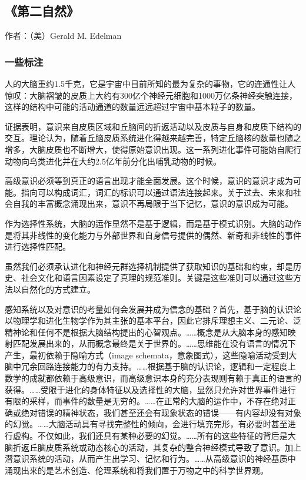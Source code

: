 \subsection{《第二自然》}

作者：（美）Gerald M. Edelman

\subsubsection{一些标注}

人的大脑重约1.5千克，它是宇宙中目前所知的最为复杂的事物，它的连通性让人惊叹：大脑褶皱的皮质上大约有300亿个神经元细胞和1000万亿条神经突触连接，这样的结构中可能的活动通道的数量远远超过宇宙中基本粒子的数量。

证据表明，意识来自皮质区域和丘脑间的折返活动以及皮质与自身和皮质下结构的交互。理论认为，随着丘脑皮质系统进化得越来越完善，特定丘脑核的数量也随之增多，大脑皮质也不断增大，使得原始意识出现。这一系列进化事件可能始自爬行动物向鸟类进化并在大约2.5亿年前分化出哺乳动物的时候。

高级意识必须等到真正的语言出现才能全面发展。这个时候，意识的意识才成为可能。指向可以构成词汇，词汇的标识可以通过语法连接起来。关于过去、未来和社会自我的丰富概念涌现出来，意识不再局限于当下记忆，意识的意识成为可能。

作为选择性系统，大脑的运作显然不是基于逻辑，而是基于模式识别。大脑的动作是将其非线性的变化能力与外部世界和自身信号提供的偶然、新奇和非线性的事件进行选择性匹配。

虽然我们必须承认进化和神经元群选择机制提供了获取知识的基础和约束，却是历史、社会文化和语言因素设定了真理的规范准则。关键是这些准则可以通过这些方法以自然化的方式建立。

感知系统以及对意识的考量如何会发展并成为信念的基础？首先，基于脑的认识论以物理学和进化生物学作为其主张的基本平台，因此它排斥理想主义、二元论、泛精神论和任何不是根据大脑结构提出的心智观点。……概念是从大脑本身的感知映射匹配发展出来的，从而概念最终是关于世界的。……思维能在没有语言的情况下产生，最初依赖于隐喻方式（image schemata，意象图式），这些隐喻活动受到大脑中冗余回路连接能力的有力支持。……根据基于脑的认识论，逻辑和一定程度上数学的成就都依赖于高级意识，而高级意识本身的充分表现则有赖于真正的语言的获得。……受限于进化的身体特征以及选择性的大脑，显然只允许对世界事件进行有限的采样，而事件的数量是无穷的。……在正常的大脑的运作中，不存在绝对正确或绝对错误的精神状态，我们甚至还会有现象状态的错误——有内容却没有对象的幻觉。……大脑活动具有寻找完整性的倾向，会进行填充完形，有必要时甚至进行虚构。不仅如此，我们还具有某种必要的幻觉。……所有的这些特征的背后是大脑折返丘脑皮质系统或动态核心的活动，其复杂的整合神经模式导致了意识。加上潜意识系统的活动，从而产生出学习、记忆和行为。……从高级意识的神经基质中涌现出来的是艺术创造、伦理系统和将我们置于万物之中的科学世界观。

